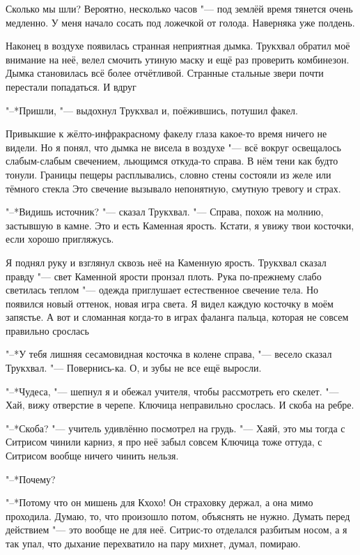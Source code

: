 \ldotst Сколько мы шли?
Вероятно, несколько часов "--- под землёй время тянется очень медленно.
У меня начало сосать под ложечкой от голода.
Наверняка уже полдень.

Наконец в воздухе появилась странная неприятная дымка.
Трукхвал обратил моё внимание на неё, велел смочить утиную маску и ещё раз проверить комбинезон.
Дымка становилась всё более отчётливой.
Странные стальные звери почти перестали попадаться.
И вдруг\ldotst

"--*Пришли, "--- выдохнул Трукхвал и, поёжившись, потушил факел.

Привыкшие к жёлто-инфракрасному факелу глаза какое-то время ничего не видели.
Но я понял, что дымка не висела в воздухе "--- всё вокруг освещалось слабым-слабым свечением, льющимся откуда-то справа.
В нём тени как будто тонули.
Границы пещеры расплывались, словно стены состояли из желе или тёмного стекла\ldotst
Это свечение вызывало непонятную, смутную тревогу и страх.

"--*Видишь источник? "--- сказал Трукхвал.
"--- Справа, похож на молнию, застывшую в камне.
Это и есть Каменная ярость.
Кстати, я увижу твои косточки, если хорошо пригляжусь.

Я поднял руку и взглянул сквозь неё на Каменную ярость.
Трукхвал сказал правду "--- свет Каменной ярости пронзал плоть.
Рука по-прежнему слабо светилась теплом "--- одежда приглушает естественное свечение тела.
Но появился новый оттенок, новая игра света.
Я видел каждую косточку в моём запястье.
А вот и сломанная когда-то в играх фаланга пальца, которая не совсем правильно срослась\ldotst

"--*У тебя лишняя сесамовидная косточка в колене справа, "--- весело сказал Трукхвал.
"--- Повернись-ка.
О, и зубы не все ещё выросли.

"--*Чудеса, "--- шепнул я и обежал учителя, чтобы рассмотреть его скелет.
"--- Хай, вижу отверстие в черепе.
Ключица неправильно срослась.
И скоба на ребре.

"--*Скоба? "--- учитель удивлённо посмотрел на грудь.
"--- Хаяй, это мы тогда с Ситрисом чинили карниз, я про неё забыл совсем\ldotst
Ключица тоже оттуда, с Ситрисом вообще ничего чинить нельзя.

"--*Почему?

"--*Потому что он мишень для Кхохо!
Он страховку держал, а она мимо проходила.
Думаю, то, что произошло потом, объяснять не нужно.
Думать перед действием "--- это вообще не для неё.
Ситрис-то отделался разбитым носом, а я так упал, что дыхание перехватило на пару михнет, думал, помираю.

